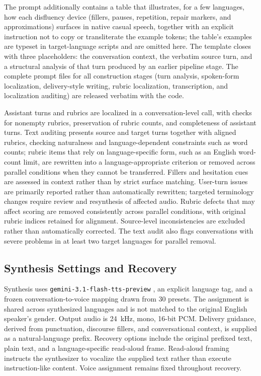 \documentclass{article}
\begin{document}
The prompt additionally contains a table that illustrates, for a few languages, how each disfluency device (fillers, pauses, repetition, repair markers, and approximations) surfaces in native casual speech, together with an explicit instruction not to copy or transliterate the example tokens; the table's examples are typeset in target-language scripts and are omitted here. The template closes with three placeholders: the conversation context, the verbatim source turn, and a structural analysis of that turn produced by an earlier pipeline stage. The complete prompt files for all construction stages (turn analysis, spoken-form localization, delivery-style writing, rubric localization, transcription, and localization auditing) are released verbatim with the code.

Assistant turns and rubrics are localized in a conversation-level call, with checks for nonempty rubrics, preservation of rubric counts, and completeness of assistant turns. Text auditing presents source and target turns together with aligned rubrics, checking naturalness and language-dependent constraints such as word counts; rubric items that rely on language-specific form, such as an English word-count limit, are rewritten into a language-appropriate criterion or removed across parallel conditions when they cannot be transferred. Fillers and hesitation cues are assessed in context rather than by strict surface matching. User-turn issues are primarily reported rather than automatically rewritten; targeted terminology changes require review and resynthesis of affected audio. Rubric defects that may affect scoring are removed consistently across parallel conditions, with original rubric indices retained for alignment. Source-level inconsistencies are excluded rather than automatically corrected. The text audit also flags conversations with severe problems in at least two target languages for parallel removal.

\subsection{Synthesis Settings and Recovery}

Synthesis uses \texttt{gemini-3.1-flash-tts-preview} \citep{google2026gemini31flashtts}, an explicit language tag, and a frozen conversation-to-voice mapping drawn from 30 presets. The assignment is shared across synthesized languages and is not matched to the original English speaker's gender. Output audio is 24~kHz, mono, 16-bit PCM. Delivery guidance, derived from punctuation, discourse fillers, and conversational context, is supplied as a natural-language prefix. Recovery options include the original prefixed text, plain text, and a language-specific read-aloud frame. Read-aloud framing instructs the synthesizer to vocalize the supplied text rather than execute instruction-like content. Voice assignment remains fixed throughout recovery.
\end{document}
